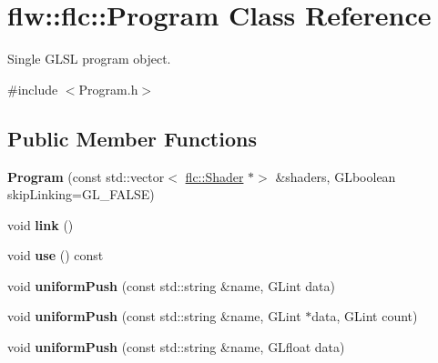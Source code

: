 \hypertarget{classflw_1_1flc_1_1Program}{}\section{flw\+:\+:flc\+:\+:Program Class Reference}
\label{classflw_1_1flc_1_1Program}


Single G\+L\+SL program object.  




{\ttfamily \#include $<$Program.\+h$>$}

\subsection*{Public Member Functions}
\begin{DoxyCompactItemize}
\item 
\mbox{\label{classflw_1_1flc_1_1Program_ac775aa5155c4a4450f721f7aeb0d127e}} 
{\bfseries Program} (const std\+::vector$<$ \hyperlink{classflw_1_1flc_1_1Shader}{flc\+::\+Shader} $\ast$$>$ \&shaders, G\+Lboolean skip\+Linking=G\+L\+\_\+\+F\+A\+L\+SE)
\item 
\mbox{\label{classflw_1_1flc_1_1Program_a520ce30c0932e26ea8478ca0e328e2c3}} 
void {\bfseries link} ()
\item 
\mbox{\label{classflw_1_1flc_1_1Program_a1c5eb7e8c479acdf183863301c5981b7}} 
void {\bfseries use} () const
\item 
\mbox{\label{classflw_1_1flc_1_1Program_a68484c02ee898b259b17734ae21a334a}} 
void {\bfseries uniform\+Push} (const std\+::string \&name, G\+Lint data)
\item 
\mbox{\label{classflw_1_1flc_1_1Program_a221826b414a0d6b241f1b9f6a27aa29b}} 
void {\bfseries uniform\+Push} (const std\+::string \&name, G\+Lint $\ast$data, G\+Lint count)
\item 
\mbox{\label{classflw_1_1flc_1_1Program_a92eed61b077f468622fad0bb1a7d0237}} 
void {\bfseries uniform\+Push} (const std\+::string \&name, G\+Lfloat data)
\item 
\mbox{\label{classflw_1_1flc_1_1Program_ab1bd6f0fdf5b2403b8454133ce6c3638}} 
$$
\end{DoxyCompactItemize}
